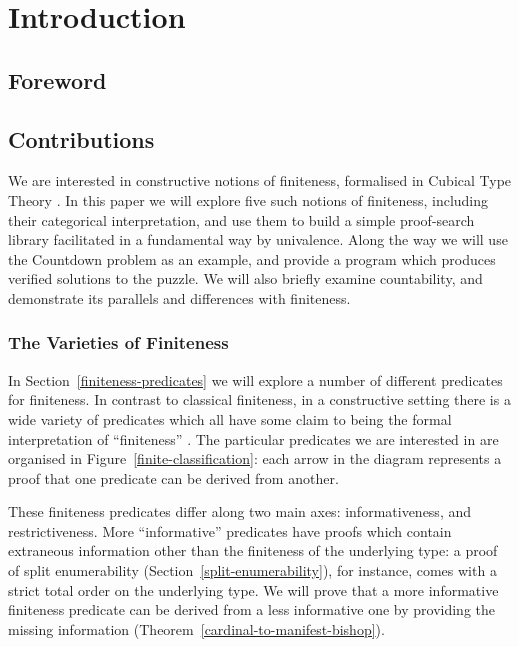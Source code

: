 \chapter{Introduction}
\section{Foreword}
\section{Contributions}
We are interested in constructive notions of finiteness, formalised in Cubical
Type Theory \cite{cohenCubicalTypeTheory2016}.
In this paper we will explore five such notions of finiteness, including their
categorical interpretation, and use them to build a simple proof-search library
facilitated in a fundamental way by univalence.
Along the way we will use the Countdown problem
\cite{huttonCountdownProblem2002} as an example, and provide a program which
produces verified solutions to the puzzle.
We will also briefly examine countability, and demonstrate its parallels and
differences with finiteness.
\subsection{The Varieties of Finiteness}
In Section~\ref{finiteness-predicates} we will explore a number of different
predicates for finiteness.
In contrast to classical finiteness, in a constructive setting there is a wide
variety of predicates which all have some claim to being the formal
interpretation of ``finiteness'' \cite{coquandConstructivelyFinite2010}.
The particular predicates we are interested in are organised in
Figure~\ref{finite-classification}: each arrow in the diagram represents a proof
that one predicate can be derived from another.



These finiteness predicates differ along two main axes: informativeness, and
restrictiveness.
More ``informative'' predicates have proofs which contain extraneous information
other than the finiteness of the underlying type: a proof of split enumerability
(Section~\ref{split-enumerability}), for instance, comes with a strict total
order on the underlying type.
We will prove that a more informative finiteness predicate can be
derived from a less informative one by providing the missing information
(Theorem~\ref{cardinal-to-manifest-bishop}).

